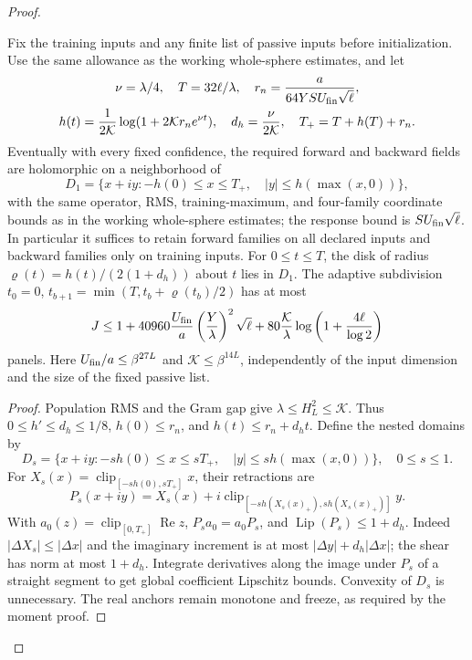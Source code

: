 \begin{proof}
\begin{claim}
\label{cp:src-panel-working}
Fix the training inputs and any finite list of passive inputs before
initialization.  Use the same allowance as the working whole-sphere estimates,
and let
\begin{gather*}
 \nu=\lambda/4,\quad T=32\ell/\lambda,\quad
 r_n=\frac a{64YSU_{\rm fin}\sqrt\ell},\\
 h(t)=\frac1{2\mathcal K}\log(1+2\mathcal K r_ne^{\nu t}),
 \quad d_h=\frac\nu{2\mathcal K},\quad T_+=T+h(T)+r_n.
\end{gather*}
Eventually with every fixed confidence, the required forward and
backward fields are holomorphic on a neighborhood of
\[
 D_1=\{x+iy:-h(0)\le x\le T_+,\quad |y|\le h(\max(x,0))\},
\]
with the same operator, RMS, training-maximum, and four-family
coordinate bounds as in the working whole-sphere estimates; the response
bound is \(SU_{\rm fin}\sqrt\ell\).  In particular it suffices
to retain forward families on all declared inputs and backward
families only on training inputs.
For \(0\le t\le T\), the disk of radius
\(\varrho(t)=h(t)/(2(1+d_h))\) about \(t\) lies in \(D_1\).
The adaptive subdivision
\(t_0=0\), \(t_{b+1}=\min(T,t_b+\varrho(t_b)/2)\)
has at most
\begin{equation}
 J\le1+40960\frac{U_{\rm fin}}a
                  \left(\frac Y\lambda\right)^2\sqrt\ell
       +80\frac{\mathcal K}{\lambda}
                  \log\left(1+\frac{4\ell}{\log2}\right)
 \label{cp:src-panel-count}
\end{equation}
panels.  Here \(U_{\rm fin}/a\le\beta^{27L}\) and
\(\mathcal K\le\beta^{14L}\), independently of the input dimension
and the size of the fixed passive list.
\end{claim}
\begin{proof}
Population RMS and the Gram gap give
\(\lambda\le H_L^2\le\mathcal K\).  Thus
\(0\le h'\le d_h\le1/8\), \(h(0)\le r_n\), and
\(h(t)\le r_n+d_ht\).  Define the nested domains by
\[
 D_s=\{x+iy:-s h(0)\le x\le sT_+,\quad
                      |y|\le s h(\max(x,0))\},\quad0\le s\le1.
\]
For \(X_s(x)=\operatorname{clip}_{[-s h(0),sT_+]}x\), their
retractions are
\[
 P_s(x+iy)=X_s(x)+i\operatorname{clip}_{[-s h(X_s(x)_+),
                                           s h(X_s(x)_+)]}y.
\]
With \(a_0(z)=\operatorname{clip}_{[0,T_+]}\operatorname{Re}z\),
\(P_sa_0=a_0P_s\), and \(\operatorname{Lip}(P_s)\le1+d_h\).
Indeed \(|\Delta X_s|\le|\Delta x|\) and the imaginary
increment is at most \(|\Delta y|+d_h|\Delta x|\); the shear
has norm at most \(1+d_h\).  Integrate derivatives along the image
under \(P_s\) of a straight segment to get global coefficient
Lipschitz bounds.  Convexity of \(D_s\) is unnecessary.  The real
anchors remain monotone and freeze, as required by the moment proof.


\end{proof}
\end{proof}
